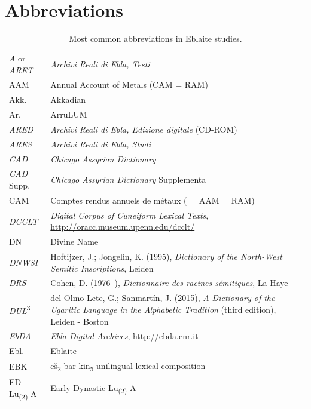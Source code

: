 \documentclass[
]{book}
\begin{document}
\hypertarget{abbreviations}{%
\section{Abbreviations}\label{abbreviations}}

\begin{longtable}[]{@{}
  >{\raggedright\arraybackslash}p{}
  >{\raggedright\arraybackslash}p{}@{}}
\caption{\label{tab:abbreviation} Most common abbreviations in Eblaite studies.}\tabularnewline
\toprule\noalign{}
\endfirsthead
\endhead
\bottomrule\noalign{}
\endlastfoot
\emph{A} or \emph{ARET} & \emph{Archivi Reali di Ebla, Testi} \\
AAM & Annual Account of Metals (CAM = RAM) \\
Akk. & Akkadian \\
Ar. & ArruLUM \\
\emph{ARED} & \emph{Archivi Reali di Ebla, Edizione digitale} (CD-ROM) \\
\emph{ARES} & \emph{Archivi Reali di Ebla, Studi} \\
\emph{CAD} & \emph{Chicago Assyrian Dictionary} \\
\emph{CAD} Supp. & \emph{Chicago Assyrian Dictionary} Supplementa \\
CAM & Comptes rendus annuels de métaux ( = AAM = RAM) \\
\emph{DCCLT} & \emph{Digital Corpus of Cuneiform Lexical Texts}, \url{http://oracc.museum.upenn.edu/dcclt/} \\
DN & Divine Name \\
\emph{DNWSI} & Hoftijzer, J.; Jongelin, K. (1995), \emph{Dictionary of the North-West Semitic Inscriptions}, Leiden \\
\emph{DRS} & Cohen, D. (1976--), \emph{Dictionnaire des racines sémitiques}, La Haye \\
\emph{DUL}\textsuperscript{3} & del Olmo Lete, G.; Sanmartín, J. (2015), \emph{A Dictionary of the Ugaritic Language in the Alphabetic Tradition} (third edition), Leiden - Boston \\
\emph{EbDA} & \emph{Ebla Digital Archives}, \url{http://ebda.cnr.it} \\
Ebl. & Eblaite \\
EBK & eš\textsubscript{2}-bar-kin\textsubscript{5} unilingual lexical composition \\
ED Lu\textsubscript{(2)} A & Early Dynastic Lu\textsubscript{(2)} A \\

\end{longtable}
\end{document}
